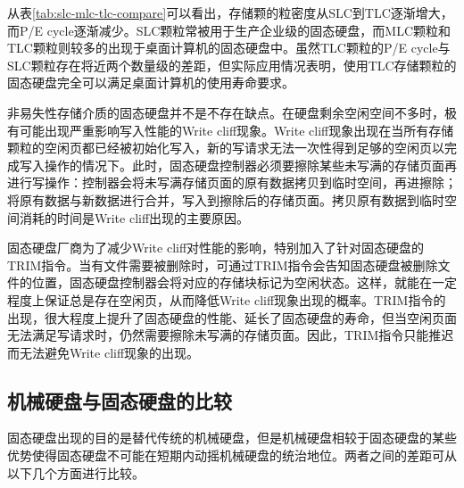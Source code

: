 \begin{enumerate}
从表\ref{tab:slc-mlc-tlc-compare}可以看出，存储颗的粒密度从SLC到TLC逐渐增大，而P/E cycle逐渐减少。SLC颗粒常被用于生产企业级的固态硬盘，而MLC颗粒和TLC颗粒则较多的出现于桌面计算机的固态硬盘中。虽然TLC颗粒的P/E cycle与SLC颗粒存在将近两个数量级的差距，但实际应用情况表明，使用TLC存储颗粒的固态硬盘完全可以满足桌面计算机的使用寿命要求。

非易失性存储介质的固态硬盘并不是不存在缺点。在硬盘剩余空闲空间不多时，极有可能出现严重影响写入性能的Write cliff现象。Write cliff现象出现在当所有存储颗粒的空闲页都已经被初始化写入，新的写请求无法一次性得到足够的空闲页以完成写入操作的情况下。此时，固态硬盘控制器必须要擦除某些未写满的存储页面再进行写操作：控制器会将未写满存储页面的原有数据拷贝到临时空间，再进擦除；将原有数据与新数据进行合并，写入到擦除后的存储页面。拷贝原有数据到临时空间消耗的时间是Write cliff出现的主要原因。

固态硬盘厂商为了减少Write cliff对性能的影响，特别加入了针对固态硬盘的TRIM指令。当有文件需要被删除时，可通过TRIM指令会告知固态硬盘被删除文件的位置，固态硬盘控制器会将对应的存储块标记为空闲状态。这样，就能在一定程度上保证总是存在空闲页，从而降低Write cliff现象出现的概率。TRIM指令的出现，很大程度上提升了固态硬盘的性能、延长了固态硬盘的寿命，但当空闲页面无法满足写请求时，仍然需要擦除未写满的存储页面。因此，TRIM指令只能推迟而无法避免Write cliff现象的出现。
\end{enumerate}

\subsection{机械硬盘与固态硬盘的比较}
固态硬盘出现的目的是替代传统的机械硬盘，但是机械硬盘相较于固态硬盘的某些优势使得固态硬盘不可能在短期内动摇机械硬盘的统治地位。两者之间的差距可从以下几个方面进行比较。

